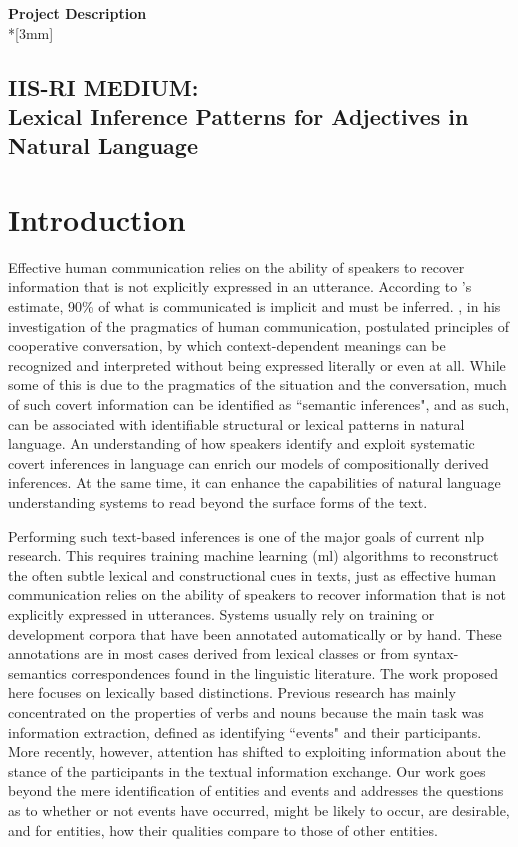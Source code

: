 \documentclass[10pt]{article}
\begin{document}
\begin{center}
{\LARGE{\bf Project Description}}\\*[3mm]
\subsection*{IIS-RI MEDIUM: \\
Lexical Inference Patterns for Adjectives in Natural Language}
\end{center}


\section{Introduction}

Effective human communication relies on the ability of speakers to recover information that is not explicitly expressed in an utterance. According to \cite{graesser1985implicit}'s estimate, 90\% of what 
is communicated is implicit and must be inferred. \cite{grice1975logic}, in his investigation 
of the pragmatics of human communication, postulated principles of cooperative 
conversation, by which context-dependent meanings can be recognized and interpreted 
without being expressed literally or even at all. While some of this is due to the pragmatics of the situation and the conversation, much of such covert information can be identified as ``semantic inferences", and as such, can be associated with identifiable structural or lexical patterns in natural language.
An understanding of how speakers identify and exploit systematic covert inferences in language can enrich our models of compositionally derived inferences. At the same time, it can enhance the capabilities of natural language understanding systems to read beyond the surface forms of the text.

Performing such text-based inferences is one of the major goals of current {\sc nlp} research. 
This requires training machine learning ({\sc ml}) algorithms to  reconstruct the often subtle lexical and constructional cues in texts, just as effective human communication relies on the ability of speakers to recover information that is not explicitly expressed in utterances. Systems usually rely on training or development corpora that have been annotated automatically or by hand.  These annotations are in most cases derived from lexical classes or from syntax-semantics correspondences found in the linguistic literature. The work proposed here focuses on lexically based distinctions. Previous research has mainly concentrated on the properties of verbs and nouns because the main task was information extraction, defined as identifying ``events" and their participants. More recently, however, attention has shifted to exploiting information about the stance of the participants in the textual information exchange. Our work goes beyond the mere identification of entities and events and addresses the questions as to whether or not events have  occurred, might be likely to occur, are desirable, and for entities, how their qualities compare to those of other entities. 
\end{document}
